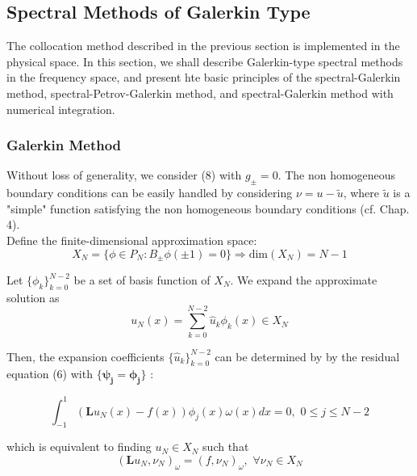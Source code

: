 \subsection{Spectral Methods of Galerkin Type}

The collocation method described in the previous section is implemented in the physical space. In this section, we shall describe Galerkin-type spectral methods in the frequency space, and present hte basic principles of the spectral-Galerkin method, spectral-Petrov-Galerkin method, and spectral-Galerkin method with numerical integration.

\subsubsection{Galerkin Method}

Without loss of generality, we consider (8) with $ g_{ \pm } = 0 $. The non homogeneous boundary conditions can be easily handled by considering $ \nu = u - \tilde{u} $, where $ \tilde{ u } $ is a "simple" function satisfying the non homogeneous boundary conditions (cf. Chap. 4). \\
\indent Define the finite-dimensional approximation space:
\[
	X_{ N } = \{ \phi \in P_{ N }: B_{ \pm } \phi \left( \pm 1 \right) = 0 \} \Rightarrow \mathrm{ dim } \left( X_{ N } \right) = N-1
\]

Let $ \{ \phi_{ k } \}_{ k=0 }^{ N-2 } $ be a set of basis function of $ X_{ N } $. We expand the approximate solution as
\begin{equation}
	u_{ N }(x) = \sum_{ k=0 }^{ N-2 } \widehat{u}_{ k } \phi_{ k } \left( x \right) \in X_{ N }
\end{equation}

Then, the expansion coefficients $ \{ \widehat{ u }_{ k } \}_{ k=0 }^{ N-2 } $ can be determined by by the residual equation (6) with $ \{ \mathbf{ \psi_{ j } = \mathbf{ \phi }_{ j } } \} $ :

\begin{equation}
	\int_{ -1 }^{ 1 } \left( \mathbf{ L } u_{ N }(x) - f(x) \right) \phi_{ j } (x) \omega (x) dx = 0, \hspace{4pt} 0 \leq j \leq N-2
\end{equation}

which is equivalent to finding $ u_{ N } \in X_{ N } $ such that
\begin{equation}
	\left( \mathbf{ L } u_{ N }, \nu_{ N } \right)_{ \omega } = \left( f, \nu_{ N } \right)_{ \omega }, \hspace{4pt} \forall \nu_{ N } \in X_{ N }
\end{equation}


